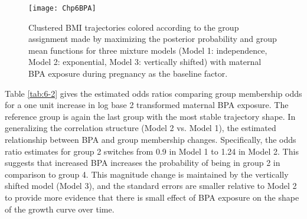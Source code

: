 \begin{figure}[ht]
\centering
\texttt{[image: Chp6BPA]}
\caption{Clustered BMI trajectories colored according to the group assignment made by maximizing the posterior probability and group mean functions for three mixture models (Model 1: independence, Model 2: exponential, Model 3: vertically shifted) with maternal BPA exposure during pregnancy as the baseline factor.}
\label{fig:6-2}
\end{figure}

Table \ref{tab:6-2} gives the estimated odds ratios comparing group membership odds for a one unit increase in log base 2 transformed maternal BPA exposure. The reference group is again the last group with the most stable trajectory shape. In generalizing the correlation structure (Model 2 vs. Model 1), the estimated relationship between BPA and group membership changes. Specifically, the odds ratio estimates for group 2 switches from 0.9 in Model 1 to 1.24 in Model 2. This suggests that increased BPA increases the probability of being in group 2 in comparison to group 4. This magnitude change is maintained by the vertically shifted model (Model 3), and the standard errors are smaller relative to Model 2 to provide more evidence that there is small effect of BPA exposure on the shape of the growth curve over time. 

